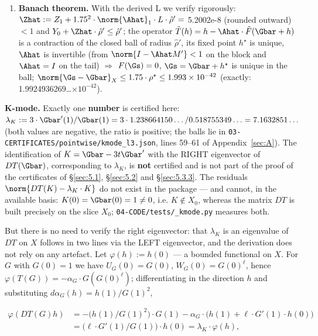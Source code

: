 \begin{enumerate}
\texttt{fixL\_\allowbreak result.json\allowbreak ::\allowbreak Delta\_\allowbreak T5}); there is no independent cross-check of
these quantities in the package.
\item \textbf{Banach theorem.} With the derived L we verify rigorously:
$\Zhat := Z_1 + 1.75^{2}\cdot \norm{\Ahat}_1\cdot L\cdot \hat{\rho}' =$ 5.2002e-8
(rounded outward) $< 1$ and $Y_0 + \Zhat\cdot \hat{\rho}' \le \hat{\rho}'$; the
operator $\tilde{T}(h) = h - \Ahat\cdot \tilde{F}(\Gbar+h)$ is a contraction of
the closed ball of radius $\hat{\rho}'$, its fixed point $h^{\star}$ is unique,
$\Ahat$ is invertible (from $\norm{I-\Ahat M'}<1$ on the block and $\Ahat=I$ on
the tail) $\Rightarrow$ $F(\Gs)=0$, $\Gs = \Gbar + h^{\star}$ is unique in the
ball; $\norm{\Gs-\Gbar}_X \le 1.75\cdot \rho^{\star} \le 1.993\times 10^{-42}$
(exactly: 1.9924936269\ldots$\times 10^{-42}$).
\end{enumerate}

\textbf{K-mode.} Exactly one \textbf{number} is certified here:
$\lambda_K := 3\cdot \Gbar'(1)/\Gbar(1) = 3\cdot 1.238664150\ldots
/0.518755349\ldots = 7.1632851\ldots$
(both values are negative, the ratio is positive; the balls lie in
\texttt{03-\allowbreak CERTIFICATES/\allowbreak pointwise/\allowbreak kmode\_\allowbreak l3.json}, lines 59--61 of Appendix~\ref{sec:A}).
The identification of $K = \Gbar - 3t\Gbar'$ with the RIGHT eigenvector of
$DT(\Gbar)$, corresponding to $\lambda_K$, is \textbf{not} certified and is not
part of the proof of the certificates of \S\ref{sec:5.1}, \S\ref{sec:5.2} and \S\ref{sec:5.3.3}. The residuals $\norm{DT(K) -
\lambda_K\cdot K}$ do not exist in the package --- and cannot, in the available
basis: $K(0) = \Gbar(0) = 1 \ne 0$, i.e. $K \notin X_{0}$, whereas the matrix
$DT$ is built precisely on the slice $X_{0}$; \texttt{04-\allowbreak CODE/\allowbreak tests/\allowbreak \_\allowbreak kmode.py}
measures both.

But there is no need to verify the right eigenvector: that $\lambda_K$ is an
eigenvalue of $DT$ on $X$ follows in two lines via the LEFT eigenvector, and
the derivation does not rely on any artefact. Let $\varphi(h) := h(0)$ --- a
bounded functional on $X$. For $G$ with $G(0) = 1$ we have $U_G(0) = G(0)$,
$W_G(0) = G(0)^\ell$, hence $\varphi(T(G)) = -\alpha_G\cdot G(G(0)^\ell)$;
differentiating in the direction $h$ and substituting
$d\alpha_G(h) = h(1)/G(1)^{2}$,

\begin{align*}
\varphi(DT(G)h) &= -\bigl(h(1)/G(1)^{2}\bigr)\cdot G(1) - \alpha_G\cdot
\bigl( h(1) + \ell\cdot G'(1)\cdot h(0) \bigr) \\
&= \bigl(\ell\cdot G'(1)/G(1)\bigr)\cdot h(0) = \lambda_K\cdot \varphi(h) ,
\end{align*}


